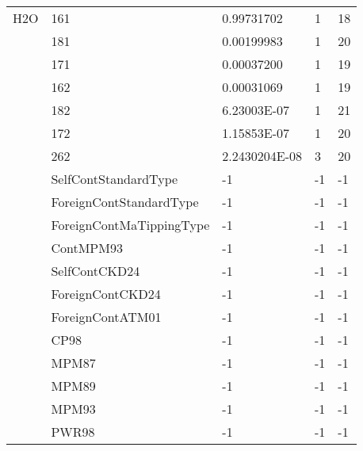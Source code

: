 \begin{longtable}{lllll}
  H2O& 161&  0.99731702&  1&18\\
     & 181&  0.00199983&  1&20\\
     & 171&  0.00037200&  1&19\\
     & 162&  0.00031069&  1&19\\
     & 182&  6.23003E-07& 1&21\\
     & 172&  1.15853E-07& 1& 20\\
     & 262&  2.2430204E-08&  3&20\\
     &SelfContStandardType&     -1    &-1    &-1     \\
     &ForeignContStandardType&  -1    &-1    &-1     \\
     &ForeignContMaTippingType& -1    &-1    &-1     \\
     &ContMPM93&                -1    &-1    &-1     \\
     &SelfContCKD24&            -1    &-1    &-1     \\
     &ForeignContCKD24&         -1    &-1    &-1     \\
     &ForeignContATM01&         -1    &-1    &-1     \\
     &CP98&                     -1    &-1    &-1     \\
     &MPM87&                    -1    &-1    &-1     \\
     &MPM89&                    -1    &-1    &-1     \\
     &MPM93&                    -1    &-1    &-1     \\
     &PWR98&                    -1    &-1    &-1     \\


\end{longtable}
